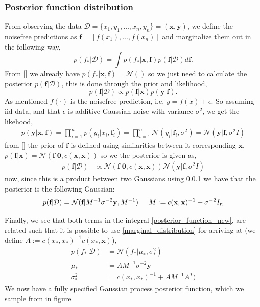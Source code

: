 \subsubsection{Posterior function distribution}
From observing the data $\mathcal{D} = \{x_1,y_1, \dots , x_n,y_n\} = (\textbf{x}, \textbf{y})$, we define the noisefree
predictions as $\textbf{f} = [f(x_1), \dots, f(x_n)]$ and marginalize them out in the following way, 
\begin{equation}\label{posterior_function_new}
    p(f_*|\mathcal{D})= \int p(f_*|\textbf{x}, \textbf{f})p(\textbf{f}|\mathcal{D})d\textbf{f}.
\end{equation} 
From \eqref{} we already have $p(f_*|\textbf{x}, \textbf{f}) = \mathcal{N}()$ so we just need to
calculate the posterior $p(\textbf{f}|\mathcal{D})$, this is done through the prior and likelihood, 
$$p(\textbf{f}|\mathcal{D}) \propto p(\textbf{f}|\textbf{x}) p(\textbf{y}|\textbf{f}).$$ 
As mentioned $f(\cdot)$ is the noisefree prediction, i.e. $y
= f(x)+ \epsilon$. So assuming iid data, and that $\epsilon$ is additive Gaussian
noise with variance $\sigma^2$, we get the likehood, 
\begin{align*}
    p(\textbf{y}|\textbf{x}, \textbf{f}) = \prod_{i=1}^n p(y_i|x_i,\textbf{f}_i) = \prod_{i=1}^n \mathcal{N}(y_i|\textbf{f}_i,\sigma^2) = \mathcal{N}(\textbf{y}|\textbf{f},\sigma^2 I)
\end{align*}
from \eqref{} the prior of $\textbf{f}$ is defined using similarities between it corresponding $\textbf{x}$, 
$p(\textbf{f}|\textbf{x}) = \mathcal{N}(\textbf{f}|\textbf{0},c(\textbf{x}, \textbf{x}))$
so we the posterior is given as, 
\begin{align*}
    p(\textbf{f}|\mathcal{D}) &\propto \mathcal{N}(\textbf{f}|\textbf{0}, c(\textbf{x}, \textbf{x})) \mathcal{N}(\textbf{y}|\textbf{f},\sigma^2 I)
\end{align*}
now, since this is a product between two Gaussians using \ref{} we have that the posterior is the following Gaussian: 
\begin{equation*}
    p(\textbf{f}|\mathcal{D}) = \mathcal{N}(\textbf{f}|M^{-1} \sigma^{-2}\textbf{y}, M^{-1}) \hspace{0.5cm}M := c(\textbf{x}, \textbf{x})^{-1}+\sigma^{-2} I_n
\end{equation*}

Finally, we see that both terms in the integral \eqref{posterior_function_new}, are related such
that it is possible to use \eqref{marginal_distribution} for arriving at (we define $A :=  c(x_*,
x_*)^{-1} c(x_*, \textbf{x})$), 
\begin{align*}
    p(f_*|\mathcal{D}) &= \mathcal{N}(f_*|\mu_*,\sigma_*^2 )\\
    \mu_* &=  AM^{-1}\sigma^{-2}\textbf{y}\\
    \sigma_*^2 &=  c(x_*, x_*)^{-1}+AM^{-1}A^T)
\end{align*}
We now have a fully specified Gaussian process posterior function, which we sample from 
in figure


